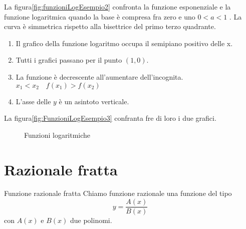 La figura\nobs\vref{fig:funzioniLogEsempio2} confronta la funzione esponenziale e la funzione logaritmica  quando la base è compresa fra zero e uno $0<a<1$ . La curva è simmetrica rispetto alla bisettrice del primo terzo quadrante. 
\begin{enumerate}
	\item Il grafico della funzione logaritmo occupa il semipiano positivo delle x.
	\item Tutti i grafici passano per il punto $(1,0)$.
	\item La funzione è decrescente all'aumentare dell'incognita. $x_1<x_2\quad f(x_1)>f(x_2)$ 
	\item L'asse delle $y$ è un asintoto verticale.
\end{enumerate}
La figura\nobs\vref{fig:FunzioniLogEsempio3} confranta fre di loro i due grafici.
\begin{figure}
	\centering
	
	\caption{Funzioni logaritmiche}
	\label{fig:FunzioniLogEsempio3}
\end{figure}
\section{Razionale fratta}
\begin{definizionet}{Funzione razionale fratta}{}
	Chiamo funzione razionale una funzione del tipo \[y=\dfrac{A(x)}{B(x)}\] con $A(x)$ e $B(x)$ due polinomi.
\end{definizionet}